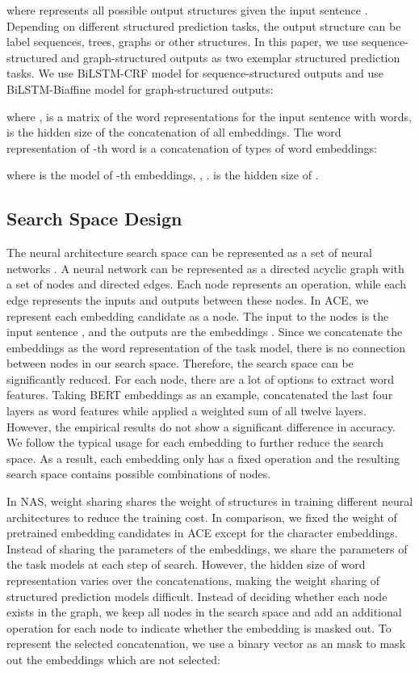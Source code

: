 \documentclass[11pt,a4paper]{article}
\begin{document}
where  represents all possible output structures given the input sentence . Depending on different structured prediction tasks, the output structure  can be label sequences, trees, graphs or other structures. In this paper, we use sequence-structured and graph-structured outputs as two exemplar structured prediction tasks. We use BiLSTM-CRF model \citep{ma-hovy-2016-end,lample-etal-2016-neural} for sequence-structured outputs and use BiLSTM-Biaffine model \citep{dozat2016deep} for graph-structured outputs:

where ,  is a matrix of the word representations for the input sentence  with  words,  is the hidden size of the concatenation of all embeddings. The word representation  of -th word is a concatenation of  types of word embeddings:

where  is the model of -th embeddings, , .  is the hidden size of . 

\subsection{Search Space Design}
\label{sec:search_space}
The neural architecture search space can be represented as a set of neural networks \citep{elsken2019neural}. 
A neural network can be represented as a directed acyclic graph with a set of nodes and directed edges.
Each node represents an operation, while each edge represents the inputs and outputs between these nodes. 
In ACE, we represent each embedding candidate as a node. 
The input to the nodes is the input sentence , and the outputs are the embeddings . Since we concatenate the embeddings as the word representation of the task model, there is no connection between nodes in our search space. Therefore, the search space can be significantly reduced. 
For each node, there are a lot of options to extract word features. 
Taking BERT embeddings as an example, \citet{devlin-etal-2019-bert} concatenated the last four layers as word features while \citet{kondratyuk-straka-2019-75} applied a weighted sum of all twelve layers. However, the empirical results \citep{devlin-etal-2019-bert} do not show a significant difference in accuracy. We follow the typical usage for each embedding to further reduce the search space. As a result, each embedding only has a fixed operation and the resulting search space contains  possible combinations of nodes.



In NAS, weight sharing \citep{pmlr-v80-pham18a} shares the weight of structures in training different neural architectures to reduce the training cost. In comparison, we fixed the weight of pretrained embedding candidates in ACE except for the character embeddings. 
Instead of sharing the parameters of the embeddings, we share the parameters of the task models at each step of search.
However, the hidden size of word representation varies over the concatenations, making the weight sharing of structured prediction models difficult. Instead of deciding whether each node exists in the graph, we keep all nodes in the search space and add an additional operation for each node to indicate whether the embedding is masked out. To represent the selected concatenation, we use a binary vector  as an mask to mask out the embeddings which are not selected:
\end{document}
